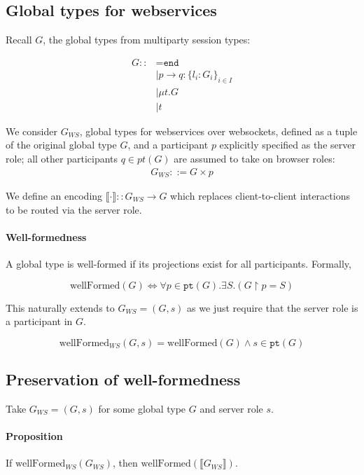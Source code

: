 \documentclass{article}
\begin{document}
\subsection*{Global types for webservices}

Recall $G$, the global types from multiparty session types:

\begin{align*}
G ::&= \texttt{end} \\
&\mid p \to q : \{ l_i: G_i \}_{i \in I} \\
&\mid \mu t. G \\
&\mid t
\end{align*}

We consider $G_{WS}$, global types for webservices over 
websockets, defined as a tuple of the original global type $G$, 
and a participant $p$ explicitly specified as the server role;
all other participants $q \in pt(G)$ are assumed to take
on browser roles:
\begin{align*}
G_{WS} ::= G \times p
\end{align*}

We define an encoding $\llbracket \cdot \rrbracket :: G_{WS} \to G$
which replaces client-to-client interactions to be routed via
the server role.

\paragraph{Well-formedness} A global type is well-formed if its
projections exist for all participants. Formally,

\[ \text{wellFormed}(G) \Longleftrightarrow 
\forall p \in \texttt{pt}(G). \exists S. (G \upharpoonright p = S) \]

This naturally extends to $G_{WS} = (G, s)$ as we just require that
the server role is a participant in $G$.

\[ \text{wellFormed}_{WS}(G, s) = \text{wellFormed}(G)
\wedge s \in \texttt{pt}(G) \]

\subsection*{Preservation of well-formedness} 

Take $G_{WS} = 
(G, s)$ for some global type $G$ and server role $s$. 

\paragraph{Proposition}
If $\text{wellFormed}_{WS}(G_{WS})$, 
then $\text{wellFormed}(\llbracket G_{WS} \rrbracket)$.
\end{document}

